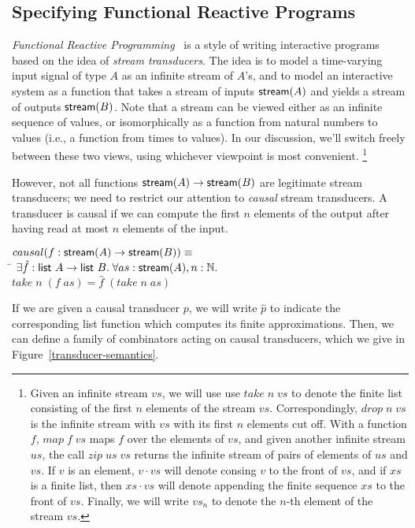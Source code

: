 \documentclass[preprint,natbib]{sigplanconf}
\begin{document}
\subsection{Specifying Functional Reactive Programs}

\emph{Functional Reactive Programming}~\cite{frp} is a style of
writing interactive programs based on the idea of \emph{stream
  transducers}.  The idea is to model a time-varying input signal of
type $A$ as an infinite stream of $A$'s, and to model an interactive
system as a function that takes a stream of inputs $\mbox{\textsf{{stream}}}({A})$ and
yields a stream of outputs $\mbox{\textsf{{stream}}}({B})$. Note that a stream can be
viewed either as an infinite sequence of values, or isomorphically as
a function from natural numbers to values (i.e., a function from times
to values). In our discussion, we'll switch freely between these two
views, using whichever viewpoint is most convenient.
\footnote{Given an infinite stream $vs$, we will use use $take\;n\;vs$ to denote
the finite list consisting of the first $n$ elements of the stream
$vs$. Correspondingly, $drop\;n\;vs$ is the infinite stream with $vs$
with its first $n$ elements cut off. With a function $f$, $map\;f\;vs$
maps $f$ over the elements of $vs$, and given another infinite stream
$us$, the call $zip\;us\;vs$ returns the infinite stream of pairs of
elements of $us$ and $vs$. If $v$ is an element, $v \cdot vs$ will 
denote consing $v$ to the front of $vs$, and if $xs$ is a finite list, then
$xs \cdot vs$ will denote appending the finite sequence $xs$ to the
front of $vs$. Finally, we will write $vs_n$ to denote the $n$-th element
of the stream $vs$.}

However, not all functions $\mbox{\textsf{{stream}}}({A}) \to \mbox{\textsf{{stream}}}({B})$ are legitimate
stream transducers; we need to restrict our attention to \emph{causal}
stream transducers. A transducer is causal if we can compute the first
$n$ elements of the output after having read at most $n$ elements of
the input. 

\begin{tabbing}
$causal(f : \mbox{\textsf{{stream}}}({A}) \to \mbox{\textsf{{stream}}}({B})) \equiv$ \\
\;\;\= $\exists \hat{f} : \mbox{\textsf{{list }}}{A} \to \mbox{\textsf{{list }}}{B}.\;\forall as:\mbox{\textsf{{stream}}}({A}), n:\mathbb{N}.$ \\
    \> \;\;$take\;n\;(f\;as) = \hat{f}\;(take\;n\;as)$ 
\end{tabbing}

If we are given a causal transducer $p$, we will write $\hat{p}$ to
indicate the corresponding list function which computes its finite
approximations. Then, we can define a family of combinators acting on
causal transducers, which we give in Figure~\ref{transducer-semantics}.
\end{document}
